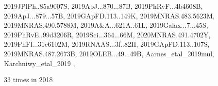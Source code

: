 \documentclass[12pt]{article}
\begin{document}
\begin{description}
{2019JPlPh..85a9007S,%
2019ApJ...870...87B,%
2019PhRvF...4b4608B,%
2019ApJ...879...57B,%
2019GApFD.113..149K,%
2019MNRAS.483.5623M,%
2019MNRAS.490.5788M,%
2019A&A...621A..61L,%
2019Galax...7...45S,%
2019PhRvE..99d3206R,%
2019Sci...364...66M,%
2020MNRAS.491.4702Y,%
2019PhFl...31e6102M,%
2019RNAAS...3f..82H,%
2019GApFD.113..107S,%
2019MNRAS.487.2673B,%
2019OLEB...49...49B,%
Aarnes_etal_2019mul,%
Karchniwy_etal_2019%
},\item
\item %
33 times in 2018 \citep{
2018AN....339..127K,%
2018A&A...614A.101V,%
2018A&A...616A..72W,%
2018A&A...609A..51W,%
}
\end{description}
\end{document}
